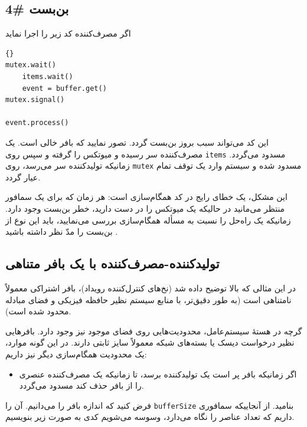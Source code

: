 \documentclass{book}
\begin{document}
\subsection{بن‌بست \#4}


    اگر مصرف‌کننده کد زیر را اجرا نماید

\begin{latin}
\begin{lstlisting}[title=\rl{راه‌حل معیوب مصرف‌کننده}]{}
mutex.wait()
    items.wait()
    event = buffer.get()
mutex.signal()

event.process()
\end{lstlisting}
\end{latin}
%
    این کد می‌تواند سبب بروز بن‌بست گردد. تصور نمایید که بافر خالی است. یک مصرف‌کننده سر رسیده و میوتکس را گرفته و سپس روی {\tt items}
    مسدود می‌گردد. زمانیکه تولید‌کننده سر می‌رسد،‌ روی {\tt mutex} مسدود شده و سیستم وارد یک توقف تمام عیار گردد. 

    این مشکل، یک خطای رایج در کد همگام‌سازی است: هر زمان که برای یک سمافور منتظر می‌مانید در حالیکه یک میوتکس را در دست دارید، 
    خطر بن‌بست وجود دارد. زمانیکه یک راه‌حل را نسبت به مسأله همگام‌سازی بررسی می‌نمایید، باید این نوع از بن‌بست را مدّ نظر داشته باشید .


\subsection{تولیدکننده-مصرف‌کننده با یک بافر متناهی}

    در این مثالی که بالا توضیح داده شد (نخ‌های کنترل‌کننده رویداد)، بافر اشتراکی معمولاً نامتناهی است (به طور دقیق‌تر، 
    با منابع سیستم نظیر حافظه فیزیکی و فضای مبادله محدود شده است).

    گرچه در هستهٔ سیستم‌عامل، محدودیت‌هایی روی فضای موجود نیز وجود دارد. بافرهایی نظیر درخواست دیسک یا بسته‌های شبکه معمولاً سایز ثابتی دارند. 
    در این گونه موارد،‌ یک محدودیت همگام‌سازی دیگر نیز داریم:

\begin{itemize}

\item 
    اگر زمانیکه بافر پر است یک تولیدکننده برسد، تا زمانیکه یک مصرف‌کننده عنصری را از بافر حذف کند مسدود می‌گردد. 

\end{itemize}

    فرض کنید که اندازه بافر را می‌دانیم. آن را {\tt bufferSize} بنامید. از آنجاییکه سمافوری داریم که تعداد عناصر را نگاه می‌دارد،‌ وسوسه می‌شویم 
    کدی به صورت زیر بنویسیم.
\end{document}
